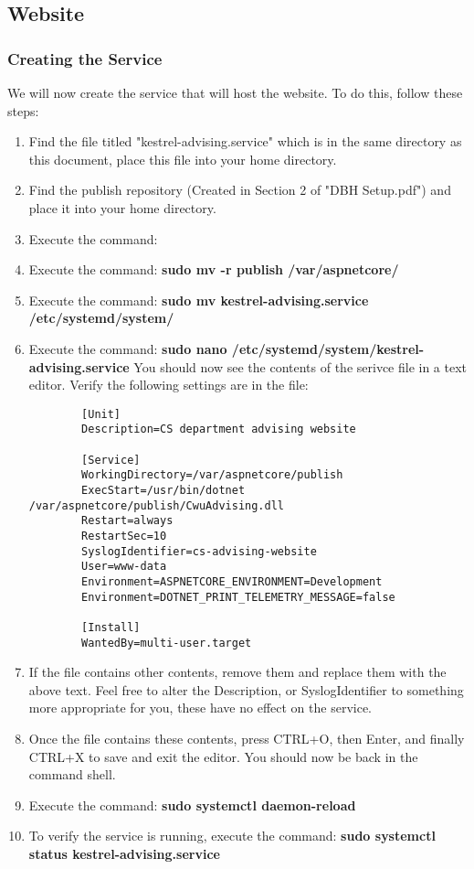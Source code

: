 \documentclass[letterpaper]{article}
\begin{document}
	\subsection{Website}
	\subsubsection{Creating the Service}
	We will now create the service that will host the website. To do this, follow these steps:
	\begin{enumerate}
		\item Find the file titled "kestrel-advising.service" which is in the same directory as this document, place this file into your home directory.
		\item Find the publish repository (Created in Section 2 of "DBH Setup.pdf") and place it into your home directory.
		\item Execute the command: \textbf{}
		\item Execute the command: \textbf{sudo mv -r publish /var/aspnetcore/}
		\item Execute the command: \textbf{sudo mv kestrel-advising.service /etc/systemd/system/}
		\item Execute the command: \textbf{sudo nano /etc/systemd/system/kestrel-advising.service} You should now see the contents of the serivce file in a text editor. Verify the following settings are in the file:
		\begin{verbatim}
		[Unit]
		Description=CS department advising website
		
		[Service]
		WorkingDirectory=/var/aspnetcore/publish
		ExecStart=/usr/bin/dotnet /var/aspnetcore/publish/CwuAdvising.dll
		Restart=always
		RestartSec=10
		SyslogIdentifier=cs-advising-website
		User=www-data
		Environment=ASPNETCORE_ENVIRONMENT=Development
		Environment=DOTNET_PRINT_TELEMETRY_MESSAGE=false
		
		[Install]
		WantedBy=multi-user.target
		\end{verbatim}
		\item If the file contains other contents, remove them and replace them with the above text. Feel free to alter the Description, or SyslogIdentifier to something more appropriate for you, these have no effect on the service.
		\item Once the file contains these contents, press CTRL+O, then Enter, and finally CTRL+X to save and exit the editor. You should now be back in the command shell.
		\item Execute the command: \textbf{sudo systemctl daemon-reload}
		\item To verify the service is running, execute the command: \textbf{sudo systemctl status kestrel-advising.service}
	\end{enumerate}
	
	
\end{document}
